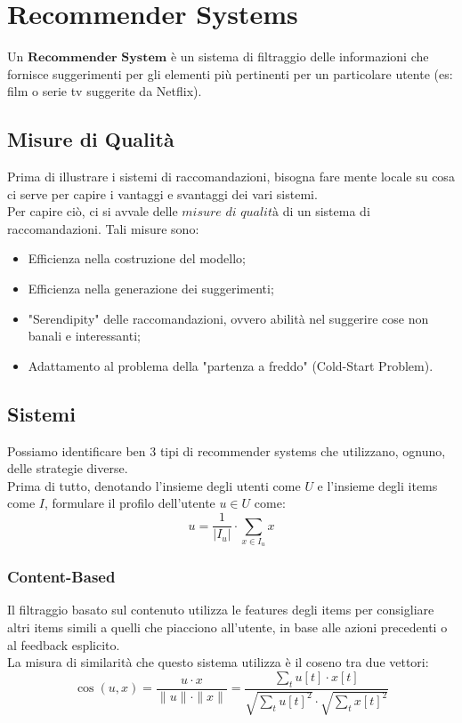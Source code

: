 \chapter{Recommender Systems}
    Un $\textbf{Recommender System}$ è un sistema di filtraggio delle informazioni che fornisce suggerimenti per gli elementi più pertinenti per un particolare utente (es: film o serie tv suggerite da Netflix).
    
    \section{Misure di Qualità}
        Prima di illustrare i sistemi di raccomandazioni, bisogna fare mente locale su cosa ci serve per capire i vantaggi e svantaggi dei vari sistemi.
        \\[1\baselineskip]
        Per capire ciò, ci si avvale delle $\textit{misure di qualità}$ di un sistema di raccomandazioni.
        Tali misure sono:
            \begin{itemize}
                \item Efficienza nella costruzione del modello;
                \item Efficienza nella generazione dei suggerimenti;
                \item "Serendipity" delle raccomandazioni, ovvero abilità nel suggerire cose non banali e interessanti;
                \item Adattamento al problema della "partenza a freddo" (Cold-Start Problem).
            \end{itemize}

    \section{Sistemi}
        Possiamo identificare ben 3 tipi di recommender systems che utilizzano, ognuno, delle strategie diverse.
        \\
        Prima di tutto, denotando l'insieme degli utenti come $U$ e l'insieme degli items come $I$, formulare il profilo dell'utente $u \in U$ come:
            $$ u = \frac{1}{|I_{u}|} \cdot \sum_{x \in I_{u}}{x}$$

        \subsection{Content-Based}
            Il filtraggio basato sul contenuto utilizza le features degli items per consigliare altri items simili a quelli che piacciono all'utente, in base alle azioni precedenti o al feedback esplicito.
            \\[1\baselineskip]
            La misura di similarità che questo sistema utilizza è il coseno tra due vettori:
                $$ \cos(u, x) = \frac{u \cdot x}{\|u\| \cdot \|x\|} = \frac{\sum_{t}{u[t] \cdot x[t]}}{\sqrt{\sum_{t}{u[t]^{2}}} \cdot \sqrt{\sum_{t}{x[t]^{2}}}} $$


